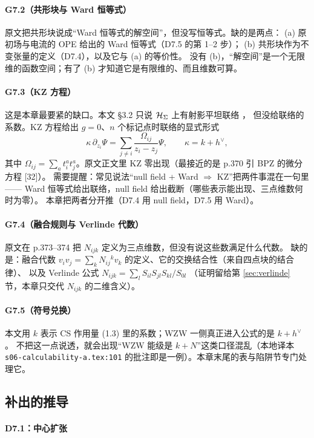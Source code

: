 \paragraph{G7.2（共形块与 Ward 恒等式）}
原文把共形块说成“Ward 恒等式的解空间”，但没写恒等式。缺的是两点：
(a) 原初场与电流的 OPE 给出的 Ward 恒等式（D7.5 的第 1--2 步）；
(b) 共形块作为不变张量的定义（D7.4），以及它与 (a) 的等价性。
没有 (b)，“解空间”是一个无限维的函数空间；有了 (b) 才知道它是有限维的、而且维数可算。

\paragraph{G7.3（KZ 方程）}
这是本章最要紧的缺口。本文 \S3.2 只说 $\mathcal{H}_\Sigma$ 上有射影平坦联络 ，
但没给联络的系数。KZ 方程给出 $g=0$、$n$ 个标记点时联络的显式形式
\[
\kappa\,\partial_{z_i}\Psi=\sum_{j\ne i}\frac{\Omega_{ij}}{z_i-z_j}\Psi,
\qquad \kappa=k+h^\vee ,
\]
其中 $\Omega_{ij}=\sum_a t^a_i t^a_j$。原文正文里 KZ 零出现（最接近的是 p.370 引 BPZ 的微分方程 [32]）。
需要提醒：常见说法“null field + Ward $\Rightarrow$ KZ”把两件事混在一句里——
Ward 恒等式给出联络，null field 给出截断（哪些表示能出现、三点维数何时为零）。
本章把两者分开推（D7.4 用 null field，D7.5 用 Ward）。

\paragraph{G7.4（融合规则与 Verlinde 代数）}
原文在 p.373--374 把 $N_{ijk}$ 定义为三点维数，但没有说这些数满足什么代数。
缺的是：融合代数 $v_iv_j=\sum_k N_{ij}{}^k v_k$ 的定义、它的交换结合性（来自四点块的结合律）、
以及 Verlinde 公式 $N_{ijk}=\sum_l S_{il}S_{jl}S_{kl}/S_{0l}$
（证明留给第 \ref{sec:verlinde} 节，本章只交代 $N_{ijk}$ 的二维含义）。

\paragraph{G7.5（符号兑换）}
本文用 $k$ 表示 CS 作用量 (1.3) 里的系数；WZW 一侧真正进入公式的是 $k+h^\vee$。
不把这一点说透，就会出现“WZW 能级是 $k+N$”这类口径混乱（本地译本
\texttt{s06-calculability-a.tex:101} 的批注即是一例）。本章末尾的表与陷阱节专门处理它。

\subsection{补出的推导}

\paragraph{D7.1：中心扩张}

